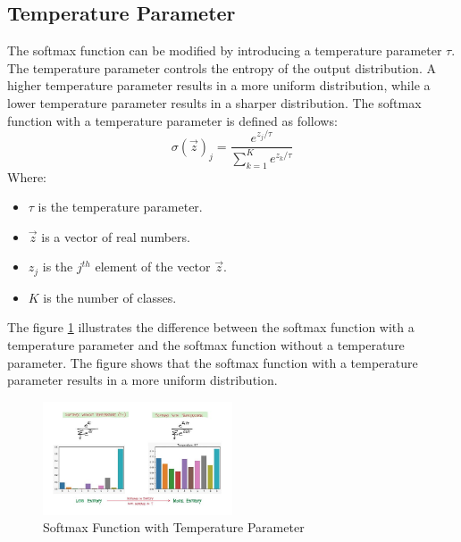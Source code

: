 \subsection{Temperature Parameter}
The softmax function can be modified by introducing a temperature parameter $\tau$. The temperature parameter controls the entropy of the output distribution. A higher temperature parameter results in a more uniform distribution, while a lower temperature parameter results in a sharper distribution. The softmax function with a temperature parameter is defined as follows:
\begin{equation}
    \sigma(\vec{z})_j = \frac{e^{z_j/\tau}}{\sum_{k=1}^{K} e^{z_k/\tau}}
\end{equation}
Where:
\begin{itemize}[noitemsep]
    \item $\tau$ is the temperature parameter.
    \item $\vec{z}$ is a vector of real numbers.
    \item $z_j$ is the $j^{th}$ element of the vector $\vec{z}$.
    \item $K$ is the number of classes.
\end{itemize}
The figure \ref{fig:softmax_temperature} illustrates the difference between the softmax function with a temperature parameter and the softmax function without a temperature parameter. The figure shows that the softmax function with a temperature parameter results in a more uniform distribution.

\begin{figure}[H]
    \centering
    \includegraphics[width=0.5\textwidth]{assets/0_7xj72SjtNHvCMQlV.jpg}
    \caption[Softmax Function with Temperature Parameter]{Softmax Function with Temperature Parameter  \cite{Medium}}
    \label{fig:softmax_temperature}
\end{figure}